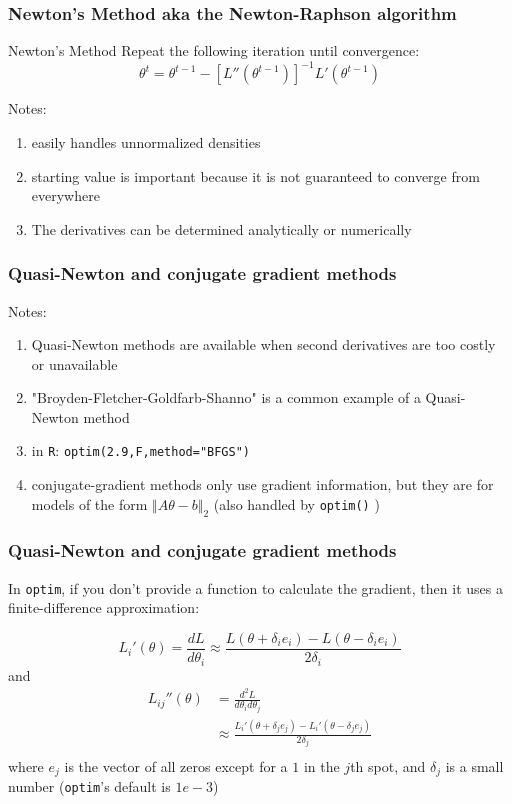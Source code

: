 \documentclass{beamer}
\begin{document}
\begin{frame}
\frametitle{Newton's Method aka the Newton-Raphson algorithm}


\begin{block}{Newton's Method}
Repeat the following iteration until convergence:
\[
\theta^{t} = \theta^{t-1} - [L''(\theta^{t-1})]^{-1} L'(\theta^{t-1} ) 
\]
\end{block}

Notes:
\begin{enumerate}
\item easily handles unnormalized densities
\item starting value is important because it is not guaranteed to converge from everywhere
\item The derivatives can be determined analytically or numerically
\end{enumerate}

\end{frame}

\begin{frame}[fragile]
\frametitle{Quasi-Newton and conjugate gradient methods}

Notes:
\begin{enumerate}
\item Quasi-Newton methods are available when second derivatives are too costly or unavailable
\item "Broyden-Fletcher-Goldfarb-Shanno" is a common example of a Quasi-Newton method
\item in \verb|R|: \verb|optim(2.9,F,method="BFGS")|
\item conjugate-gradient methods only use gradient information, but they are for models of the form $\Vert A \theta - b \Vert_2$ (also handled by \verb|optim()| )
\end{enumerate}

\end{frame}

\begin{frame}[fragile]
\frametitle{Quasi-Newton and conjugate gradient methods}

In \verb|optim|, if you don't provide a function to calculate the gradient, then it uses a finite-difference approximation:

$$
L_i'(\theta) = \frac{dL}{d\theta_i } \approx \frac{L(\theta + \delta_i e_i ) - L(\theta - \delta_i e_i )}{2 \delta_i }
$$
and
\begin{align*}
L_{ij}''(\theta) &= \frac{d^2L}{d\theta_i d\theta_j } \\
&\approx \frac{ L_i'(\theta + \delta_j e_j ) - L_i'(\theta - \delta_j e_j )}{2 \delta_j } \\
\end{align*}
where $e_j$ is the vector of all zeros except for a $1$ in the $j$th spot, and $\delta_j$ is a small number (\verb|optim|'s default is $1e-3$)
\end{frame}
\end{document}

